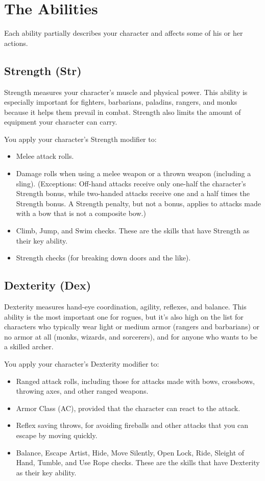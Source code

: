 \section{The Abilities}
Each ability partially describes your character and affects some of his or her actions.

\subsection{Strength (Str)}
Strength measures your character's muscle and physical power. This ability is especially important for fighters, barbarians, paladins, rangers, and monks because it helps them prevail in combat. Strength also limits the amount of equipment your character can carry.

You apply your character's Strength modifier to:
\begin{itemize}
\item Melee attack rolls.
\item Damage rolls when using a melee weapon or a thrown weapon (including a sling). (Exceptions: Off-hand attacks receive only one-half the character's Strength bonus, while two-handed attacks receive one and a half times the Strength bonus. A Strength penalty, but not a bonus, applies to attacks made with a bow that is not a composite bow.)
\item Climb, Jump, and Swim checks. These are the skills that have Strength as their key ability.
\item Strength checks (for breaking down doors and the like).
\end{itemize}

\subsection{Dexterity (Dex)}
Dexterity measures hand-eye coordination, agility, reflexes, and balance. This ability is the most important one for rogues, but it's also high on the list for characters who typically wear light or medium armor (rangers and barbarians) or no armor at all (monks, wizards, and sorcerers), and for anyone who wants to be a skilled archer.

You apply your character's Dexterity modifier to:
\begin{itemize}
\item Ranged attack rolls, including those for attacks made with bows, crossbows, throwing axes, and other ranged weapons.
\item Armor Class (AC), provided that the character can react to the attack.
\item Reflex saving throws, for avoiding fireballs and other attacks that you can escape by moving quickly.
\item Balance, Escape Artist, Hide, Move Silently, Open Lock, Ride, Sleight of Hand, Tumble, and Use Rope checks. These are the skills that have Dexterity as their key ability.
\end{itemize}
